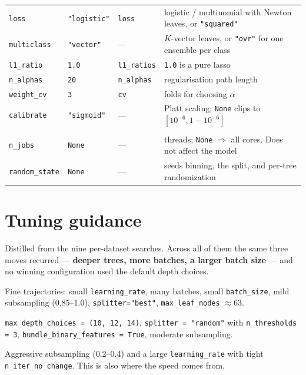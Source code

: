 \documentclass[11pt,a4paper]{article}
\newcommand{\code}[1]{\texttt{\small #1}}
\theoremstyle{definition}
\begin{document}
\begin{center}
\begin{tabular}{lllp{}}
\code{loss} & \code{"logistic"} & \code{loss} & logistic / multinomial with Newton leaves, or \code{"squared"} \\
\code{multiclass} & \code{"vector"} & --- & $K$-vector leaves, or \code{"ovr"} for one ensemble per class \\
\code{l1\_ratio} & \code{1.0} & \code{l1\_ratios} & \code{1.0} is a pure lasso \\
\code{n\_alphas} & \code{20} & \code{n\_alphas} & regularisation path length \\
\code{weight\_cv} & \code{3} & \code{cv} & folds for choosing $\alpha$ \\
\code{calibrate} & \code{"sigmoid"} & --- & Platt scaling; \code{None} clips to $[10^{-6}, 1-10^{-6}]$ \\
\addlinespace
\multicolumn{4}{l}{\emph{Execution}} \\
\code{n\_jobs} & \code{None} & --- & threads; \code{None} $\Rightarrow$ all cores. Does not affect the model \\
\code{random\_state} & \code{None} & --- & seeds binning, the split, and per-tree randomization \\
\bottomrule
\end{tabular}
\end{center}

\section{Tuning guidance}\label{app:tuning}

Distilled from the nine per-dataset searches. Across all of them the same three
moves recurred --- \textbf{deeper trees, more batches, a larger batch size} ---
and no winning configuration used the default depth choices.

\begin{description}[leftmargin=1.5em,style=nextline]
\item[Smooth, low-dimensional signal.] Fine trajectories: small
\code{learning\_rate}, many batches, small \code{batch\_size}, mild subsampling
(0.85--1.0), \code{splitter="best"}, \code{max\_leaf\_nodes} $\approx 63$.
\item[High-dimensional or one-hot data.] \code{max\_depth\_choices = (10,
12, 14)}, \code{splitter = "random"} with \code{n\_thresholds = 3},
\code{bundle\_binary\_features = True}, moderate subsampling.
\item[Noisy data with irrelevant features.] Aggressive subsampling (0.2--0.4)
and a large \code{learning\_rate} with tight \code{n\_iter\_no\_change}. This is
also where the speed comes from.
\end{description}
\end{document}
